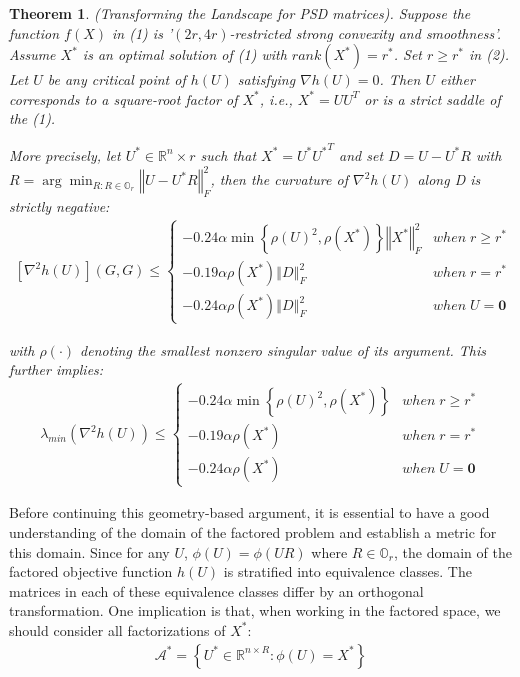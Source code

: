 \documentclass{article}
\newtheorem{theorem}{Theorem}
\begin{document}
\begin{theorem}
(Transforming the Landscape for PSD matrices). Suppose the function $f(X)$ in (1) is '$(2r, 4r)$-restricted strong convexity and smoothness'. Assume $X^*$ is an optimal solution of (1) with
$rank(X^*) = r^*$. Set $r\ge r^*$ in (2). Let $U$ be any critical point of $h\left(U\right)$ satisfying $\nabla h(U) = 0$. Then $U$ either
corresponds to a square-root factor of $X^*$, i.e., $X^* = UU^T$ or is a strict saddle of the (1).

More precisely, let $U^*\in \mathbb{R}^n\times r$ such that $X^*=U^*{U^*}^T$ and set $D=U-U^*R$ with $R=\arg\min_{R:R\in \mathbb{O}_r}\left\Vert U- U^* R \right\Vert^2_F$, then the curvature of $\nabla^2h\left(U\right)$ along D is strictly negative:
\begin{align*}
    \left[\nabla^{2}h\left(U\right)\right]\left(G,G\right)\le\begin{cases}
-0.24\alpha\min\left\{ \rho\left(U\right)^{2},\rho\left(X^{*}\right)\right\} \left\Vert X^{*}\right\Vert _{F}^{2} & when\;r\ge r^{*}\\
-0.19\alpha\rho\left(X^{*}\right)\left\Vert D\right\Vert _{F}^{2} & when\;r=r^{*}\\
-0.24\alpha\rho\left(X^{*}\right)\left\Vert D\right\Vert _{F}^{2} & when\;U=\boldsymbol{0}
\end{cases}
\end{align*}

with $\rho\left(\cdot\right)$ denoting the smallest nonzero singular value of its argument. This further implies:
\begin{align*}
    \lambda_{min} \left(\nabla^{2}h\left(U\right)\right)\le\begin{cases}
-0.24\alpha\min\left\{ \rho\left(U\right)^{2},\rho\left(X^{*}\right)\right\}  & when\;r\ge r^{*}\\
-0.19\alpha\rho\left(X^{*}\right) & when\;r=r^{*}\\
-0.24\alpha\rho\left(X^{*}\right) & when\;U=\boldsymbol{0}
\end{cases}
\end{align*}
\end{theorem}

Before continuing this geometry-based argument, it is essential to have a good understanding of the domain of the
factored problem and establish a metric for this domain. Since for any $U$, $\phi\left(U\right)=\phi\left(UR\right)$ where $R\in \mathbb{O}_r$, the domain of the factored objective function $h\left(U\right)$ is stratified into equivalence classes. The matrices in each of these equivalence classes differ by an orthogonal transformation. One implication is that, when working in the factored space, we should
consider all factorizations of $X^*$: 
\begin{align*}
    \mathcal{A}^*=\left\{ U^*\in \mathbb{R}^{n\times R}:\phi\left(U\right)=X^*\right\} 
\end{align*}
\end{document}
